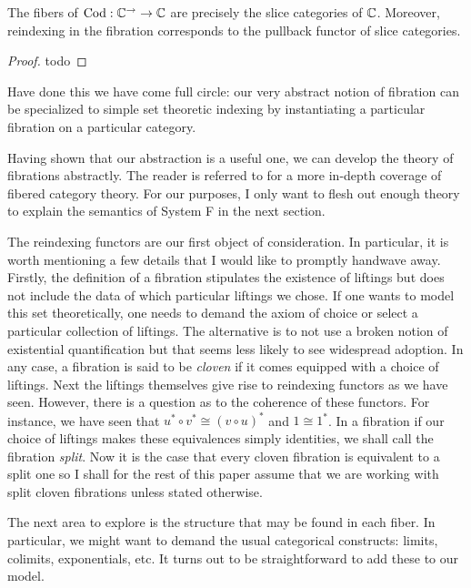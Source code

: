 \begin{lem}\label{lem:fibrations:fibersareslices}
  The fibers of $\operatorname{Cod} : \mathbb{C}^{\to} \to \mathbb{C}$ are precisely the slice
  categories of $\mathbb{C}$. Moreover, reindexing in the fibration
  corresponds to the pullback functor of slice categories.
\end{lem}
\begin{proof}
  todo
\end{proof}

Have done this we have come full circle: our very abstract notion of
fibration can be specialized to simple set theoretic indexing by
instantiating a particular fibration on a particular category.

Having shown that our abstraction is a useful one, we can develop the
theory of fibrations abstractly. The reader is referred to
\citet{Jacobs:01} for a more in-depth coverage of fibered category
theory. For our purposes, I only want to flesh out enough theory to
explain the semantics of System F in the next section.

The reindexing functors are our first object of consideration. In
particular, it is worth mentioning a few details that I would like to
promptly handwave away. Firstly, the definition of a fibration
stipulates the existence of liftings but does not include the data of
which particular liftings we chose. If one wants to model this set
theoretically, one needs to demand the axiom of choice or select a
particular collection of liftings. The alternative is to not use a
broken notion of existential quantification but that seems less likely
to see widespread adoption. In any case, a fibration is said to be
\emph{cloven} if it comes equipped with a choice of liftings. Next the
liftings themselves give rise to reindexing functors as we have
seen. However, there is a question as to the coherence of these
functors. For instance, we have seen that
$u^* \circ v^* \cong (v \circ u)^*$ and $1 \cong 1^*$. In a fibration
if our choice of liftings makes these equivalences simply identities,
we shall call the fibration \emph{split}. Now it is the case that
every cloven fibration is equivalent to a split one so I shall for the
rest of this paper assume that we are working with split cloven
fibrations unless stated otherwise.

The next area to explore is the structure that may be found in each
fiber. In particular, we might want to demand the usual categorical
constructs: limits, colimits, exponentials, etc. It turns out to be
straightforward to add these to our model.

